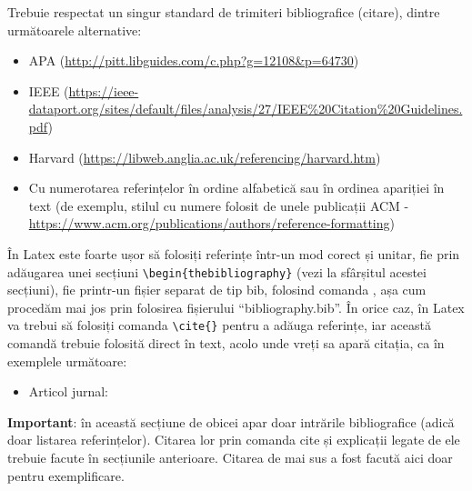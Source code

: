 \documentclass[12pt,a4paper]{report}
\begin{document}
Trebuie respectat un singur standard de trimiteri bibliografice (citare), dintre următoarele alternative:
\begin{itemize}
	\item APA (\url{http://pitt.libguides.com/c.php?g=12108\&p=64730})
	\item IEEE (\url{https://ieee-dataport.org/sites/default/files/analysis/27/IEEE\%20Citation\%20Guidelines.pdf}) 
	\item Harvard (\url{https://libweb.anglia.ac.uk/referencing/harvard.htm})
	\item Cu numerotarea referințelor în ordine alfabetică sau în ordinea apariției în text (de exemplu, stilul cu numere folosit de unele publicații ACM - \url{https://www.acm.org/publications/authors/reference-formatting}) 
\end{itemize}

În Latex este foarte ușor să folosiți referințe într-un mod corect și unitar, fie prin adăugarea unei secțiuni
\verb!\begin{thebibliography}!
(vezi la sfârșitul acestei secțiuni), fie printr-un fișier separat de tip bib, folosind comanda
\verb!!,
așa cum procedăm mai jos prin folosirea fișierului ``bibliography.bib''. În orice caz, în Latex va trebui să folosiți comanda
\verb!\cite{}!
pentru a adăuga referințe, iar această comandă trebuie folosită direct în text, acolo unde vreți sa apară citația, ca în exemplele următoare:
\begin{itemize}
	\item Articol jurnal:
\end{itemize}

\textbf{Important}: în această secțiune de obicei apar doar intrările bibliografice (adică doar listarea referințelor). Citarea lor prin comanda cite și explicații legate de ele trebuie facute în secțiunile anterioare. Citarea de mai sus a fost facută aici doar pentru exemplificare.







\end{document}
